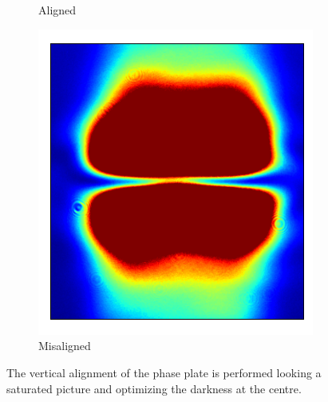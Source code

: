 \begin{figure}
\begin{subfigure}{0.3\textwidth}
        \caption{Aligned}
    \end{subfigure}
    \hfill
    \begin{subfigure}{0.3\textwidth}
        \includegraphics[width=\textwidth]{chapters/chapter_3/figures/align2.pdf}
        \caption{Misaligned}
    \end{subfigure}
    \caption{The vertical alignment of the phase plate is performed looking a saturated picture and optimizing the darkness at the centre.}
    \label{fig:alignment}
\end{figure}

